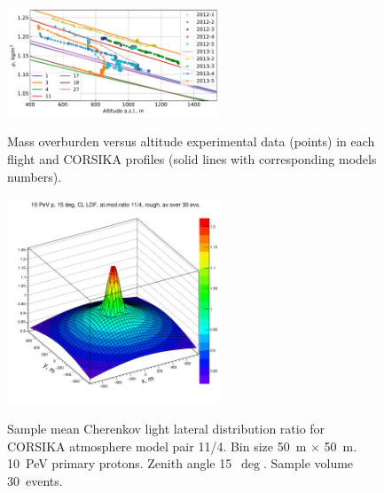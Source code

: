 \documentclass[a4paper,11pt]{article}
\begin{document}
\begin{figure}
 \begin{minipage}[t]{0.48\textwidth}
    \centering
    \includegraphics[width=15pc]{fig17.pdf}%
    \vspace{-1.0pc}
    \caption{Mass overburden versus altitude experimental data (points) in each flight and CORSIKA profiles (solid lines with corresponding models numbers).}
    \label{fig:fig17}
  \end{minipage}
\hfill
  \begin{minipage}[t]{0.48\textwidth}
    \centering
    \includegraphics[width=15pc]{11d4}%
    \vspace{-1.0pc}
    \caption{Sample mean Cherenkov light lateral distribution ratio for CORSIKA atmosphere model
    pair 11/4. Bin size 50~m $\times$ 50~m. 10~PeV primary protons. Zenith angle 15~$\deg$. Sample volume 30~events.}
\label{fig:4d11}
\end{minipage}
\end{figure}
\end{document}
